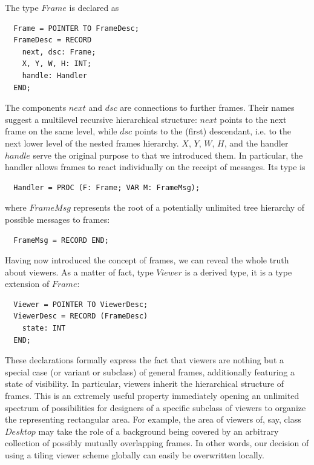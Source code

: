 The type $Frame$ is declared as
\begin{verbatim}
  Frame = POINTER TO FrameDesc;
  FrameDesc = RECORD
    next, dsc: Frame;
    X, Y, W, H: INT;
    handle: Handler
  END;
\end{verbatim}

The components $next$ and $dsc$ are connections to further frames. Their names suggest a multilevel recursive hierarchical structure: $next$ points to the next frame on the same level, while $dsc$
points to the (first) descendant, i.e. to the next lower level of the nested frames hierarchy. $X$, $Y$, $W$, $H$, and the handler $handle$ serve the original purpose to that we introduced them. In particular,
the handler allows frames to react individually on the receipt of messages. Its type is
\begin{verbatim}
  Handler = PROC (F: Frame; VAR M: FrameMsg);
\end{verbatim}
where $FrameMsg$ represents the root of a potentially unlimited tree hierarchy of possible messages to frames:
\begin{verbatim}
  FrameMsg = RECORD END;
\end{verbatim}
Having now introduced the concept of frames, we can reveal the whole truth about viewers. As a matter of fact, type $Viewer$ is a derived type, it is a type extension of $Frame$:
\begin{verbatim}
  Viewer = POINTER TO ViewerDesc;
  ViewerDesc = RECORD (FrameDesc)
    state: INT
  END;
\end{verbatim}
These declarations formally express the fact that viewers are nothing but a special case (or
variant or subclass) of general frames, additionally featuring a state of visibility. In particular,
viewers inherit the hierarchical structure of frames. This is an extremely useful property
immediately opening an unlimited spectrum of possibilities for designers of a specific subclass of
viewers to organize the representing rectangular area. For example, the area of viewers of, say,
class $Desktop$ may take the role of a background being covered by an arbitrary collection of
possibly mutually overlapping frames. In other words, our decision of using a tiling viewer scheme
globally can easily be overwritten locally.

